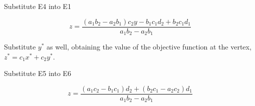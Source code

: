 \documentclass[dvipdfmx]{article}
\begin{document}
Substitute E4 into E1

\begin{equation}
  z = \frac{\left(a_{1} b_{2}-a_{2} b_{1}\right) c_{2} y-b_{1} c_{1} d_{2}+b_{2} c_{1} d_{1}}{a_{1} b_{2}-a_{2} b_{1}}
  \label{eq:E6}
\end{equation}

Substitute $y^*$ as well, obtaining the value of the objective function at the vertex, $z^*=c_1x^*+c_2y^*$.

Substitute E5 into E6

\begin{equation}
  z = \frac{\left(a_{1} c_{2}-b_{1} c_{1}\right) d_{2}+\left(b_{2} c_{1}-a_{2} c_{2}\right) d_{1}}{a_{1} b_{2}-a_{2} b_{1}}
  \label{eq:E7}
\end{equation}
\end{document}
